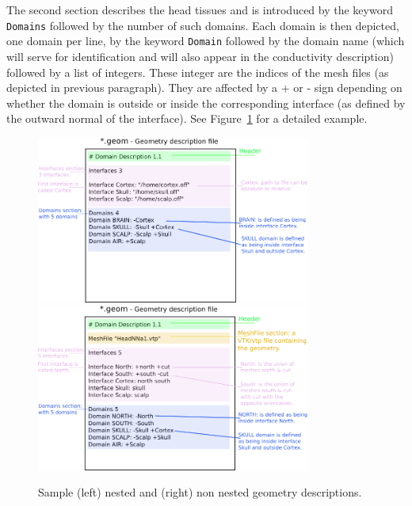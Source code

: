 \documentclass[10pt,journal]{book}
\newcommand{\example}[1]{\framebox[0.95\linewidth][l]{\parbox[t]{.93\linewidth}{\ttfamily \tiny #1}}}
\begin{document}
    The second section describes the head tissues and is introduced by the keyword {\tt Domains} followed by the number of such domains. Each domain is then
    depicted, one domain per line, by the keyword {\tt Domain} followed by the domain name (which will serve for identification and will also appear in the
    conductivity description) followed by a list of integers. These integer are the indices of the mesh files (as depicted in previous paragraph). They are
    affected by a + or - sign depending on whether the domain is outside or inside the corresponding interface (as defined by the outward normal of the interface).
    See Figure~\ref{fig:geom} for a detailed example.
    \begin{figure}[ht!]
    \includegraphics[width=9cm]{geom2.png}
    \includegraphics[width=9cm]{geom1.png}
    \caption{Sample (left) nested and (right) non nested geometry descriptions.}
    \label{fig:geom}
    \end{figure}
%
\end{document}

